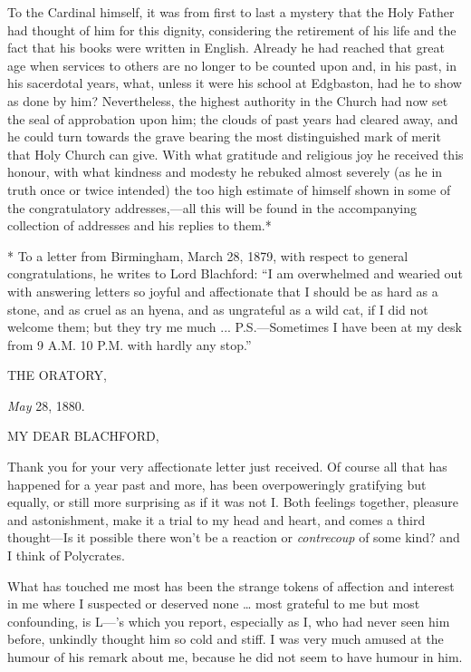 To the Cardinal himself, it was from first to last a mystery that
the Holy Father had thought of him for this dignity, considering the
retirement of his life and the fact that his books were written in
English. Already he had reached that great age when services to others
are no longer to be counted upon and, in his past, in his sacerdotal
years, what, unless it were his school at Edgbaston, had he to show as
done by him? Nevertheless, the highest authority in the Church had now
set the seal of approbation upon him; the clouds of past years had
cleared away, and he could turn towards the grave bearing the most
distinguished mark of merit that Holy Church can give. With what
gratitude and religious joy he received this honour, with what
kindness and modesty he rebuked almost severely (as he in truth once
or twice intended) the too high estimate of himself shown in some of
the congratulatory addresses,—all this will be found in the
accompanying collection of addresses and his replies to them.*

* To a letter from Birmingham, March 28, 1879, with respect to
general congratulations, he writes to Lord Blachford: ``I am
overwhelmed and wearied out with answering letters so joyful and
affectionate that I should be as hard as a stone, and as cruel as an
hyena, and as ungrateful as a wild cat, if I did not welcome them; but
they try me much ... P.S.—Sometimes I have been at my desk from 9 A.M.
10 P.M. with hardly any stop.''


THE ORATORY,

\emph{May} 28, 1880.

MY DEAR BLACHFORD,

Thank you for your very affectionate letter just received. Of course
all that has happened for a year past and more, has been
overpoweringly gratifying but equally, or still more surprising as if
it was not I. Both feelings together, pleasure and astonishment, make
it a trial to my head and heart, and comes a third thought—Is it
possible there won't be a reaction or \emph{contrecoup} of some kind?
and I think of Polycrates.

What has touched me most has been the strange tokens of affection
and interest in me where I suspected or deserved none … most
grateful to me but most confounding, is L—'s which you report,
especially as I, who had never seen him before, unkindly thought him
so cold and stiff. I was very much amused at the humour of his remark
about me, because he did not seem to have humour in him.

